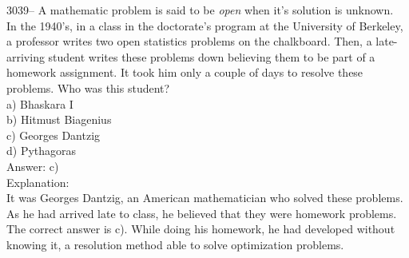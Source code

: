 \documentclass[letterpaper, 12pt]{article}
\begin{document}
3039-- A mathematic problem is said to be \emph{open} when it's solution is unknown.\\
In the 1940's, in a class in the doctorate's program at the University of Berkeley, a professor writes two open statistics problems on the chalkboard. Then, a late-arriving student writes these problems down believing them to be part of a homework assignment. It took him only a couple of days to resolve these problems.  Who was this student?\\

a) Bhaskara I\\
b) Hitmust Biagenius\\
c) Georges Dantzig\\
d) Pythagoras\\

Answer: c)\\

Explanation:\\
It was Georges Dantzig, an American mathematician who solved these problems. As he had arrived late to class, he believed that they were homework problems. The correct answer is c). While doing his homework, he had developed without knowing it, a resolution method able to solve optimization problems.\\
\end{document}
